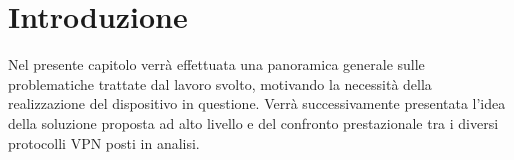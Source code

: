 \chapter{Introduzione}

\begin{citazione}
Nel presente capitolo verrà effettuata una panoramica generale sulle problematiche trattate dal lavoro svolto, motivando la necessità della realizzazione del dispositivo in questione. Verrà successivamente presentata l'idea della soluzione proposta ad alto livello e del confronto prestazionale tra i diversi protocolli VPN posti in analisi.
\end{citazione}
\newpage

